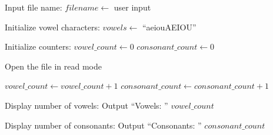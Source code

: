 \begin{algorithm}
\caption{Count Vowels and Consonants in a File}
\begin{algorithmic}[1]

\STATE Input file name:
\STATE $filename \gets$ user input

\STATE Initialize vowel characters:
\STATE $vowels \gets$ ``aeiouAEIOU''

\STATE Initialize counters:
\STATE $vowel\_count \gets 0$
\STATE $consonant\_count \gets 0$

\STATE Open the file in read mode

            \STATE $vowel\_count \gets vowel\_count + 1$
        \ELSE
            \STATE $consonant\_count \gets consonant\_count + 1$
        \ENDIF
    \ENDIF
\ENDFOR

\STATE Display number of vowels:
\STATE Output ``Vowels: '' $vowel\_count$

\STATE Display number of consonants:
\STATE Output ``Consonants: '' $consonant\_count$

\end{algorithmic}
\end{algorithm}